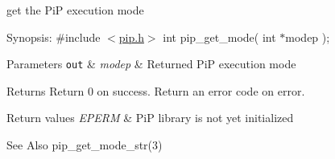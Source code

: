 get the Pi\-P execution mode

\begin{DoxyParagraph}{Synopsis\-:}
\#include $<$\hyperlink{pip_8h_source}{pip.\-h}$>$ int pip\-\_\-get\-\_\-mode( int $\ast$modep );
\end{DoxyParagraph}

\begin{DoxyParams}[1]{Parameters}
\mbox{\tt out}  & {\em modep} & Returned Pi\-P execution mode\\
\hline
\end{DoxyParams}
\begin{DoxyReturn}{Returns}
Return 0 on success. Return an error code on error. 
\end{DoxyReturn}

\begin{DoxyRetVals}{Return values}
{\em E\-P\-E\-R\-M} & Pi\-P library is not yet initialized\\
\hline
\end{DoxyRetVals}
\begin{DoxySeeAlso}{See Also}
pip\-\_\-get\-\_\-mode\-\_\-str(3) 
\end{DoxySeeAlso}

